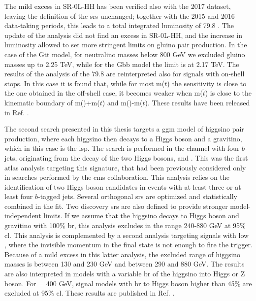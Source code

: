 The mild excess in SR-0L-HH has been verified also with the 2017 dataset,
leaving the definition of the \glspl{sr} unchanged; 
together with the 2015 and 2016 data-taking periods, this leads to a total integrated luminosity 
of 79.8 \ifb. 
The update of the analysis did not find an excess in SR-0L-HH, and the increase in luminosity 
allowed to set more stringent limits on gluino pair production. 
In the case of the Gtt model, for neutralino masses below 800 GeV we excluded gluino masses up to 
2.25 TeV, while for the Gbb model the limit is at 2.17 TeV. 
The results of the analysis of the 79.8 \ifb are reinterpreted also for signals with on-shell 
stops. In this case it is found that, while for most m($\tilde{t}$) the sensitivity 
is close to the one obtained in the off-shell case, it becomes weaker 
when m($\tilde{t}$) is close to the kinematic boundary of 
m(\ninoone)+m($t$) and m(\gluino)-m($t$).  
These results have been released in Ref. \cite{ATLAS-CONF-2018-041}.


The second search presented in this thesis targets a \gls{ggm} model of higgsino pair production, 
where each higgsino then decays to a Higgs boson and 
a gravitino, which in this case is the \gls{lsp}. The search is performed in the channel with four $b$-jets, originating from 
the decay of the two Higgs bosons, and \met. 
This was the first \gls{atlas} analysis targeting this signature, that had been 
previously considered only in searches performed by the \gls{cms} collaboration.
This analysis relies on the identification of two Higgs boson candidates in events with at least three or 
at least four $b$-tagged jets. Several orthogonal \glspl{sr} are optimized and statistically combined in the fit. 
Two discovery \glspl{sr} are also defined to provide stronger model-independent limits. 
If we assume that the higgsino decays to Higgs boson and gravitino with 100\% \gls{br}, 
this analysis excludes \mhino in the range 240-880 GeV at 95\% \gls{cl}. 
This analysis is complemented by a second analysis targeting signals with low \mhino, where the 
invisible momentum in the final state is not enough to fire the \met trigger. 
Because of a mild excess in this latter analysis, the excluded range of higgsino masses is 
between 130 and 230 GeV and between 290 and 880 GeV.
The results are also interpreted in models with a variable \gls{br} of the higgsino into Higgs or Z boson. 
For \mhino = 400 GeV, signal models with \gls{br} to Higgs boson higher than 45\% are 
excluded at 95\% \gls{cl}.
These results are published in Ref. \cite{Aaboud:2018htj}. 

